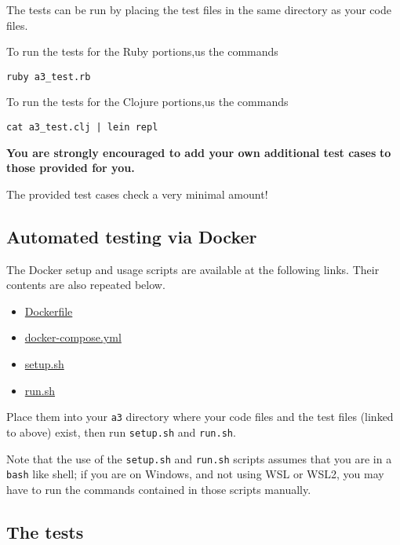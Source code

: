 \documentclass[11pt]{article}
\theoremstyle{definition}
\begin{document}
The tests can be run by placing the test files
in the same directory as your code files.

To run the tests for the Ruby portions,us the commands
\begin{verbatim}
ruby a3_test.rb
\end{verbatim}

To run the tests for the Clojure portions,us the commands
\begin{verbatim}
cat a3_test.clj | lein repl
\end{verbatim}

\begin{center}
\textbf{You are strongly encouraged to add your own additional test cases}
\textbf{to those provided for you.}

The provided test cases check a very minimal amount!
\end{center}

\subsection*{Automated testing via Docker}
\label{sec:org9e42d1f}
The Docker setup and usage scripts are available at the following links.
Their contents are also repeated below.
\begin{itemize}
\item \href{./testing/a3/Dockerfile}{Dockerfile}
\item \href{./testing/a3/docker-compose.yml}{docker-compose.yml}
\item \href{./testing/a3/setup.sh}{setup.sh}
\item \href{./testing/a3/run.sh}{run.sh}
\end{itemize}
Place them into your \texttt{a3} directory where your code files
and the test files (linked to above) exist,
then run \texttt{setup.sh} and \texttt{run.sh}.

Note that the use of the \texttt{setup.sh} and \texttt{run.sh} scripts assumes
that you are in a \texttt{bash} like shell; if you are on Windows,
and not using WSL or WSL2, you may have
to run the commands contained in those scripts manually.

\subsection*{The tests}
\label{sec:org87ff370}
\end{document}
